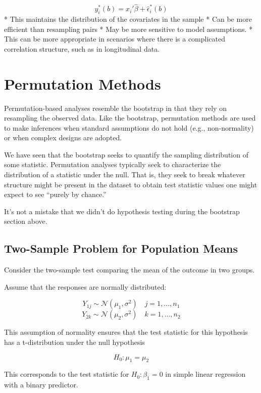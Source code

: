 \documentclass[
  letterpaper,
  DIV=11,
  numbers=noendperiod]{scrreport}
\begin{document}
\[
  y_i^*(b) = x_i' \hat \beta + \hat \epsilon_i^*(b)
  \] * This maintains the distribution of the covariates in the sample *
Can be more efficient than resampling pairs * May be more sensitive to
model assumptions. * This can be more appropriate in scenarios where
there is a complicated correlation structure, such as in longitudinal
data.


\hypertarget{permutation-methods}{%
\chapter{Permutation Methods}\label{permutation-methods}}

Permutation-based analyses resemble the bootstrap in that they rely on
resampling the observed data. Like the bootstrap, permutation methods
are used to make inferences when standard assumptions do not hold (e.g.,
non-normality) or when complex designs are adopted.

We have seen that the bootstrap seeks to quantify the sampling
distribution of some statistic. Permutation analyses typically seek to
characterize the distribution of a statistic under the null. That is,
they seek to break whatever structure might be present in the dataset to
obtain test statistic values one might expect to see ``purely by
chance.''

It's not a mistake that we didn't do hypothesis testing during the
bootstrap section above.

\hypertarget{two-sample-problem-for-population-means}{%
\section{Two-Sample Problem for Population
Means}\label{two-sample-problem-for-population-means}}

Consider the two-sample test comparing the mean of the outcome in two
groups.

Assume that the responses are normally distributed:

\[
Y_{1j} \sim \mathcal N(\mu_1, \sigma^2) \quad j = 1,..., n_1
\] \[
Y_{2k} \sim \mathcal N(\mu_2, \sigma^2) \quad k = 1, ..., n_2
\]

This assumption of normality ensures that the test statistic for this
hypothesis has a t-distribution under the null hypothesis

\[
H_0 : \mu_1 = \mu_2 
\]

This corresponds to the test statistic for \(H_0 : \beta_1 = 0\) in
simple linear regression with a binary predictor.
\end{document}
